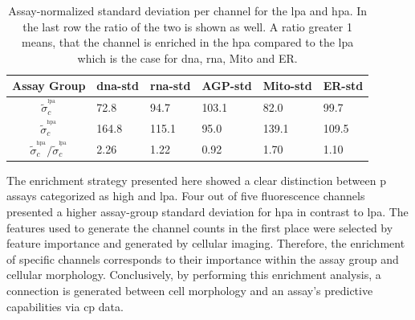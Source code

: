 \begin{table}[H]
	\centering
	\caption[Assay-Normalized Standard deviation per Channel]{Assay-normalized standard deviation per channel for the \acl{lpa} and \acl{hpa}. In the last row the ratio of the two is shown as well. A ratio greater \num{1} means, that the channel is enriched in the \acl{hpa} compared to the \acl{lpa} which is the case for \ac{dna}, \ac{rna}, Mito and ER.}
	\label{tab:channelstd}
	\begin{tabularx}{0.8\textwidth}{clllll}
		\toprule
		Assay Group& \ac{dna}-std & \ac{rna}-std & AGP-std & Mito-std & ER-std\\
		\midrule
		$\widetilde{\sigma}_c^{^\text{lpa}}$ & 72.8 & 94.7 & 103.1 & 82.0 & 99.7\\
		$\widetilde{\sigma}_c^{^\text{hpa}}$ & 164.8 & 115.1 & 95.0 & 139.1 & 109.5\\
		$\widetilde{\sigma}_c^{^\text{hpa}} / \widetilde{\sigma}_c^{^\text{lpa}}$ & 2.26 & 1.22 & 0.92 & 1.70 & 1.10\\
		\bottomrule
	\end{tabularx}
\end{table}\noindent
The enrichment strategy presented here showed a clear distinction between \ac{p} assays categorized as high and \acl{lpa}. Four out of five fluorescence channels presented a higher assay-group standard deviation for \acl{hpa} in contrast to \acl{lpa}. The features used to generate the channel counts in the first place were selected by feature importance and generated by cellular imaging. Therefore, the enrichment of specific channels corresponds to their importance within the assay group and cellular morphology. Conclusively, by performing this enrichment analysis, a connection is generated between cell morphology and an assay's predictive capabilities via \ac{cp} data.


